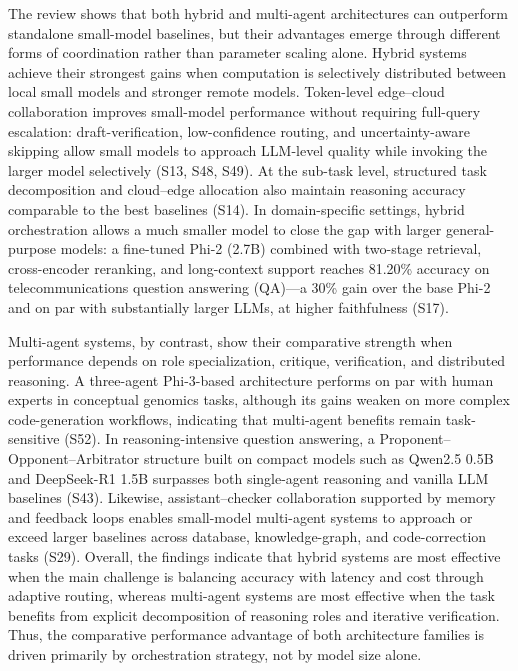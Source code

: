 The review shows that both hybrid and multi-agent architectures can outperform standalone small-model baselines, but their advantages emerge through different forms of coordination rather than parameter scaling alone. Hybrid systems achieve their strongest gains when computation is selectively distributed between local small models and stronger remote models. Token-level edge--cloud collaboration improves small-model performance without requiring full-query escalation: draft-verification, low-confidence routing, and uncertainty-aware skipping allow small models to approach LLM-level quality while invoking the larger model selectively (S13, S48, S49). At the sub-task level, structured task decomposition and cloud--edge allocation also maintain reasoning accuracy comparable to the best baselines (S14). In domain-specific settings, hybrid orchestration allows a much smaller model to close the gap with larger general-purpose models: a fine-tuned Phi-2 (2.7B) combined with two-stage retrieval, cross-encoder reranking, and long-context support reaches 81.20\% accuracy on telecommunications question answering (QA)---a 30\% gain over the base Phi-2 and on par with substantially larger LLMs, at higher faithfulness (S17).

Multi-agent systems, by contrast, show their comparative strength when performance depends on role specialization, critique, verification, and distributed reasoning. A three-agent Phi-3-based architecture performs on par with human experts in conceptual genomics tasks, although its gains weaken on more complex code-generation workflows, indicating that multi-agent benefits remain task-sensitive (S52). In reasoning-intensive question answering, a Proponent--Opponent--Arbitrator structure built on compact models such as Qwen2.5 0.5B and DeepSeek-R1 1.5B surpasses both single-agent reasoning and vanilla LLM baselines (S43). Likewise, assistant--checker collaboration supported by memory and feedback loops enables small-model multi-agent systems to approach or exceed larger baselines across database, knowledge-graph, and code-correction tasks (S29). Overall, the findings indicate that hybrid systems are most effective when the main challenge is balancing accuracy with latency and cost through adaptive routing, whereas multi-agent systems are most effective when the task benefits from explicit decomposition of reasoning roles and iterative verification. Thus, the comparative performance advantage of both architecture families is driven primarily by orchestration strategy, not by model size alone.


